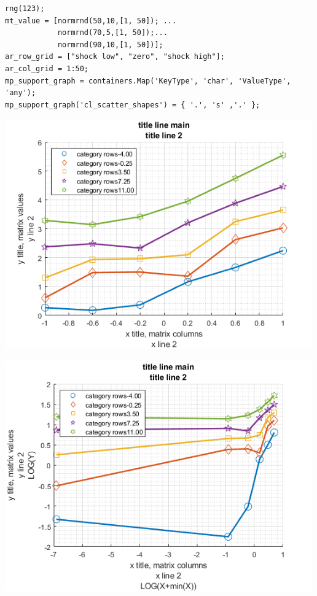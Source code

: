 \documentclass[
]{book}
\begin{document}
\begin{verbatim}
rng(123);
mt_value = [normrnd(50,10,[1, 50]); ...
            normrnd(70,5,[1, 50]);...
            normrnd(90,10,[1, 50])];
ar_row_grid = ["shock low", "zero", "shock high"];
ar_col_grid = 1:50;
mp_support_graph = containers.Map('KeyType', 'char', 'ValueType', 'any');
mp_support_graph('cl_scatter_shapes') = { '.', 's' ,'.' };
\end{verbatim}

\includegraphics[width=5.20833in,height=\textheight]{img/fx_graph_grid_images/figure_0.png}

\includegraphics[width=5.20833in,height=\textheight]{img/fx_graph_grid_images/figure_1.png}
\end{document}

